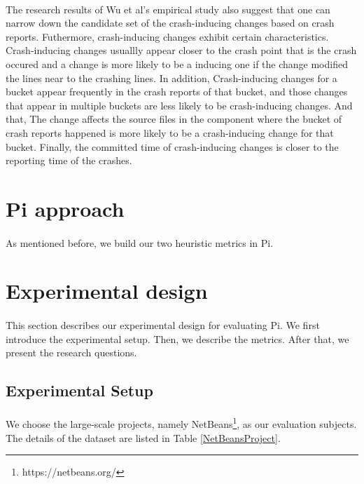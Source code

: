\documentclass[a4paper]{article}
\begin{document}
\paragraph{}
The research results of Wu et al's empirical study also suggest that one can narrow down the candidate set of the crash-inducing changes based on crash reports. Futhermore, crash-inducing changes exhibit certain characteristics. Crash-inducing changes usuallly appear closer to the crash point that is the crash occured and a change is more likely to be a inducing one if the change modified the lines near to the crashing lines. In addition, Crash-inducing changes for a bucket appear frequently in the crash reports of that bucket, and those changes that appear in multiple buckets are less likely to be crash-inducing changes. And that, The change affects the source files in the component where the bucket of crash reports happened is more likely to be a crash-inducing change for that bucket. Finally, the committed time of crash-inducing changes is closer to the reporting time of the crashes.
\vspace{-1em}


\section{Pi approach}
\paragraph{}
As mentioned before, we build our two heuristic metrics in Pi.
\vspace{-1em}


\section{Experimental design}
\paragraph{}
This section describes our experimental design for evaluating Pi. We first introduce the experimental setup. Then, we describe the metrics. After that, we present the research questions.
\vspace{-1em}

\subsection{Experimental Setup}
\paragraph{}
We choose the large-scale projects, namely NetBeans\footnote{https://netbeans.org/}​, as our evaluation subjects. The details of the dataset are listed in Table \ref{NetBeansProject}.
\vspace{-1em}
\end{document}
